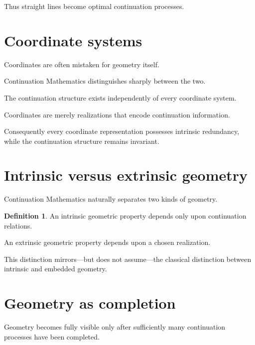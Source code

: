 \documentclass[13pt,openany]{book}
\theoremstyle{plain}
\theoremstyle{definition}
\newtheorem{definition}{Definition}[chapter]
\begin{document}
Thus straight lines become optimal continuation processes.

\section{Coordinate systems}

Coordinates are often mistaken for geometry itself.

Continuation Mathematics distinguishes sharply between the two.

The continuation structure exists independently of every coordinate system.

Coordinates are merely realizations that encode continuation information.

Consequently every coordinate representation possesses intrinsic redundancy,
while the continuation structure remains invariant.

\section{Intrinsic versus extrinsic geometry}

Continuation Mathematics naturally separates two kinds of geometry.

\begin{definition}
An intrinsic geometric property depends only upon continuation relations.

An extrinsic geometric property depends upon a chosen realization.
\end{definition}

This distinction mirrors—but does not assume—the classical distinction between
intrinsic and embedded geometry.

\section{Geometry as completion}

Geometry becomes fully visible only after sufficiently many continuation
processes have been completed.
\end{document}
